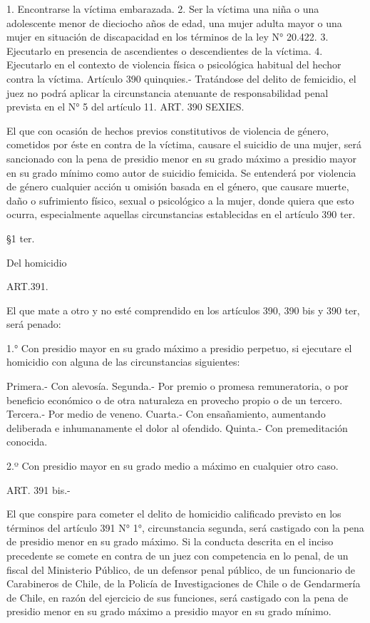     1. Encontrarse la víctima embarazada.
    2. Ser la víctima una niña o una adolescente menor de dieciocho años de edad, una mujer adulta mayor o una mujer en situación de discapacidad en los términos de la ley N° 20.422.
    3. Ejecutarlo en presencia de ascendientes o descendientes de la víctima.
    4. Ejecutarlo en el contexto de violencia física o psicológica habitual del hechor contra la víctima.
    Artículo 390 quinquies.- Tratándose del delito de femicidio, el juez no podrá aplicar la circunstancia atenuante de responsabilidad penal prevista en el N° 5 del artículo 11.
    ART. 390 SEXIES.

    El que con ocasión de hechos previos constitutivos de violencia de género, cometidos por éste en contra de la víctima, causare el suicidio de una mujer, será sancionado con la pena de presidio menor en su grado máximo a presidio mayor en su grado mínimo como autor de suicidio femicida.
    Se entenderá por violencia de género cualquier acción u omisión basada en el género, que causare muerte, daño o sufrimiento físico, sexual o psicológico a la mujer, donde quiera que esto ocurra, especialmente aquellas circunstancias establecidas en el artículo 390 ter.


    §1 ter.

    Del homicidio


    ART.391.

    El que mate a otro y no esté comprendido en los artículos 390, 390 bis y 390 ter, será penado:

    1.° Con presidio mayor en su grado máximo a presidio perpetuo, si ejecutare el homicidio con alguna de las circunstancias siguientes:

    Primera.- Con alevosía.
    Segunda.- Por premio o promesa remuneratoria, o por beneficio económico o de otra naturaleza en provecho propio o de un tercero.
    Tercera.- Por medio de veneno.
    Cuarta.-  Con ensañamiento, aumentando deliberada e inhumanamente el dolor al ofendido.
    Quinta.-  Con premeditación conocida.

    2.º Con presidio mayor en su grado medio a máximo en cualquier otro caso.



    ART. 391 bis.-

    El que conspire para cometer el delito de homicidio calificado previsto en los términos del artículo 391 N° 1°, circunstancia segunda, será castigado con la pena de presidio menor en su grado máximo.
    Si la conducta descrita en el inciso precedente se comete en contra de un juez con competencia en lo penal, de un fiscal del Ministerio Público, de un defensor penal público, de un funcionario de Carabineros de Chile, de la Policía de Investigaciones de Chile o de Gendarmería de Chile, en razón del ejercicio de sus funciones, será castigado con la pena de presidio menor en su grado máximo a presidio mayor en su grado mínimo.

